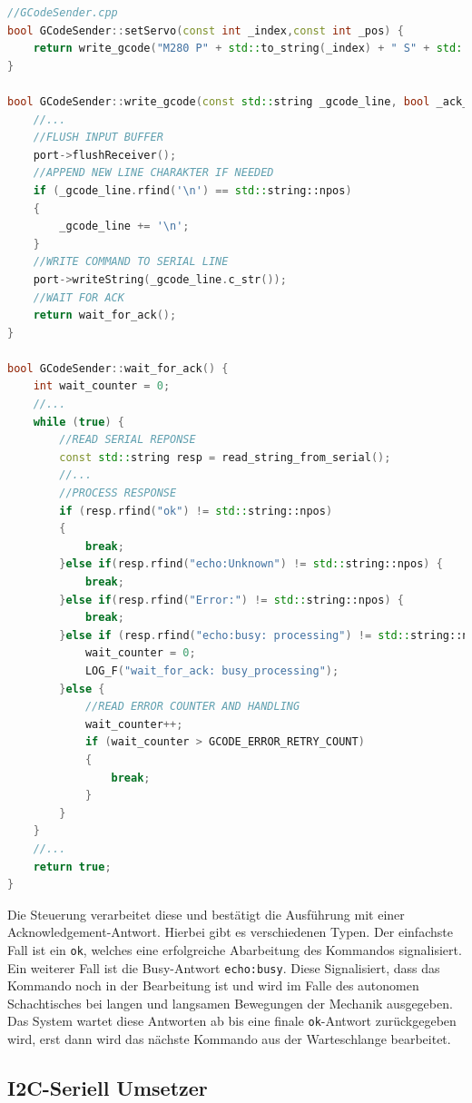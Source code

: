 \begin{lstlisting}[language={C++}]
//GCodeSender.cpp
bool GCodeSender::setServo(const int _index,const int _pos) {
    return write_gcode("M280 P" + std::to_string(_index) + " S" + std::to_string(_pos));
}

bool GCodeSender::write_gcode(const std::string _gcode_line, bool _ack_check) {
    //...
    //FLUSH INPUT BUFFER
    port->flushReceiver();
    //APPEND NEW LINE CHARAKTER IF NEEDED
    if (_gcode_line.rfind('\n') == std::string::npos)
    {
        _gcode_line += '\n';
    }
    //WRITE COMMAND TO SERIAL LINE
    port->writeString(_gcode_line.c_str());
    //WAIT FOR ACK
    return wait_for_ack();
}

bool GCodeSender::wait_for_ack() {
    int wait_counter = 0;
    //...
    while (true) {
        //READ SERIAL REPONSE
        const std::string resp = read_string_from_serial();
        //...
        //PROCESS RESPONSE
        if (resp.rfind("ok") != std::string::npos)
        {
            break;
        }else if(resp.rfind("echo:Unknown") != std::string::npos) {
            break;
        }else if(resp.rfind("Error:") != std::string::npos) {
            break;            
        }else if (resp.rfind("echo:busy: processing") != std::string::npos) {
            wait_counter = 0;
            LOG_F("wait_for_ack: busy_processing");
        }else {
            //READ ERROR COUNTER AND HANDLING
            wait_counter++;
            if (wait_counter > GCODE_ERROR_RETRY_COUNT)
            {
                break;
            }
        }
    }
    //...
    return true;
}
\end{lstlisting}

Die Steuerung verarbeitet diese und bestätigt die Ausführung mit einer
Acknowledgement-Antwort. Hierbei gibt es verschiedenen Typen. Der
einfachste Fall ist ein \passthrough{\lstinline!ok!}, welches eine
erfolgreiche Abarbeitung des Kommandos signalisiert. Ein weiterer Fall
ist die Busy-Antwort \passthrough{\lstinline!echo:busy!}. Diese
Signalisiert, dass das Kommando noch in der Bearbeitung ist und wird im
Falle des autonomen Schachtisches bei langen und langsamen Bewegungen
der Mechanik ausgegeben. Das System wartet diese Antworten ab bis eine
finale \passthrough{\lstinline!ok!}-Antwort zurückgegeben wird, erst
dann wird das nächste Kommando aus der Warteschlange bearbeitet.

\hypertarget{i2c-seriell-umsetzer}{%
\subsection{I2C-Seriell Umsetzer}\label{i2c-seriell-umsetzer}}

